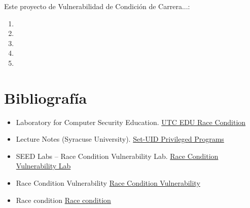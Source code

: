 \documentclass{article}
\begin{document}
Este proyecto de Vulnerabilidad de Condición de Carrera...:

\begin{enumerate}
    \item     
    \item     
    \item     
    \item 
    \item 
    
\end{enumerate}

\section*{Bibliografía}

\begin{itemize}
  \item Laboratory for Computer Security Education. \href{https://www.utc.edu/sites/default/files/2021-04/race-condition.pdf}{UTC EDU Race Condition}
  
  \item Lecture Notes (Syracuse University). \href{https://web.ecs.syr.edu/~wedu/Teaching/cis643/LectureNotes_New/Set_UID.pdf}{Set-UID Privileged Programs}
  
  \item SEED Labs – Race Condition Vulnerability Lab. \href{https://seedsecuritylabs.org/Labs_16.04/PDF/Race_Condition_new.pdf}{Race Condition Vulnerability Lab}
  
  \item Race Condition Vulnerability \href{https://moodle1920.up.pt/pluginfile.php/132925/mod_resource/content/1/Race_Condition_Extra.pdf}{Race Condition Vulnerability}
  
  \item Race condition \href{https://en.wikipedia.org/wiki/Race_condition}{Race condition}
  
\end{itemize}
\end{document}
